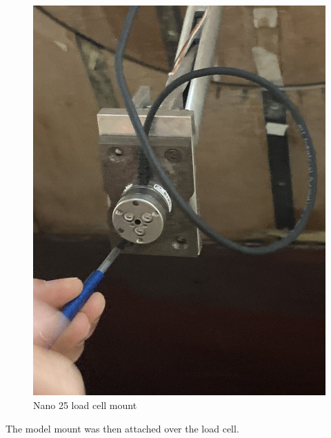 \begin{figure}[H]
    \centering
    \includegraphics[scale=0.75]{04_Methodology/Figs/loadCellMount}
    \caption{Nano 25 load cell mount}
    \label{fig:LoadCella}
\end{figure}

The model mount was then attached over the load cell. 

